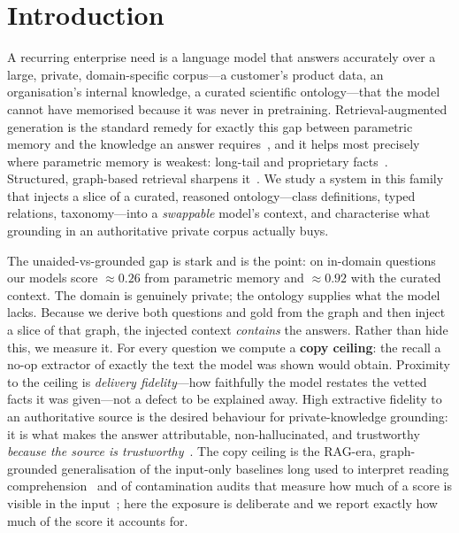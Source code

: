 \documentclass[11pt]{article}
\begin{document}
\section{Introduction}
A recurring enterprise need is a language model that answers accurately over a large, private,
domain-specific corpus---a customer's product data, an organisation's internal knowledge, a
curated scientific ontology---that the model cannot have memorised because it was never in
pretraining. Retrieval-augmented generation is the standard remedy for exactly this gap between
parametric memory and the knowledge an answer requires~\cite{lewis2020rag,gao2023ragsurvey},
and it helps most precisely where parametric memory is weakest: long-tail and proprietary
facts~\cite{mallen2023trust}. Structured, graph-based retrieval sharpens
it~\cite{edge2024graphrag,guo2024lightrag,baek2023kaping,pan2024unifying}. We study a system in
this family that injects a slice of a curated, reasoned ontology---class definitions, typed
relations, taxonomy---into a \emph{swappable} model's context, and characterise what grounding
in an authoritative private corpus actually buys.

The unaided-vs-grounded gap is stark and is the point: on in-domain questions our models score
$\approx0.26$ from parametric memory and $\approx0.92$ with the curated context. The domain is
genuinely private; the ontology supplies what the model lacks. Because we derive both questions
and gold from the graph and then inject a slice of that graph, the injected context
\emph{contains} the answers. Rather than hide this, we measure it. For every question we compute
a \textbf{copy ceiling}: the recall a no-op extractor of exactly the text the model was shown
would obtain. Proximity to the ceiling is \emph{delivery fidelity}---how faithfully the model
restates the vetted facts it was given---not a defect to be explained away. High extractive
fidelity to an authoritative source is the desired behaviour for private-knowledge grounding:
it is what makes the answer attributable, non-hallucinated, and trustworthy \emph{because the
source is trustworthy}~\cite{es2023ragas,adlakha2024evaluating}. The copy ceiling is the RAG-era,
graph-grounded generalisation of the input-only baselines long used to interpret reading
comprehension~\cite{kaushik2018reading} and of contamination audits that measure how much of a
score is visible in the input~\cite{sainz2023contamination,golchin2024timetravel}; here the
exposure is deliberate and we report exactly how much of the score it accounts for.
\end{document}
